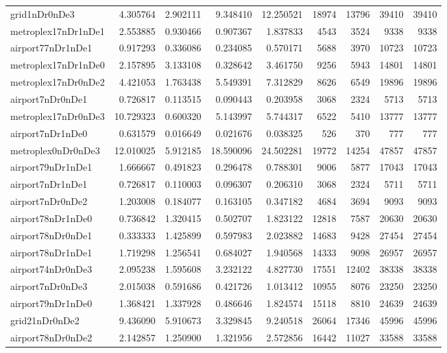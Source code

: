 \begin{longtable}{|l|r|r|r|r|r|r|r|r|}
grid1nDr0nDe3 & 4.305764 & 2.902111 & 9.348410 & 12.250521 & 18974 & 13796 & 39410 & 39410 \\
metroplex17nDr1nDe1 & 2.553885 & 0.930466 & 0.907367 & 1.837833 & 4543 & 3524 & 9338 & 9338 \\
airport77nDr1nDe1 & 0.917293 & 0.336086 & 0.234085 & 0.570171 & 5688 & 3970 & 10723 & 10723 \\
metroplex17nDr1nDe0 & 2.157895 & 3.133108 & 0.328642 & 3.461750 & 9256 & 5943 & 14801 & 14801 \\
metroplex17nDr0nDe2 & 4.421053 & 1.763438 & 5.549391 & 7.312829 & 8626 & 6549 & 19896 & 19896 \\
airport7nDr0nDe1 & 0.726817 & 0.113515 & 0.090443 & 0.203958 & 3068 & 2324 & 5713 & 5713 \\
metroplex17nDr0nDe3 & 10.729323 & 0.600320 & 5.143997 & 5.744317 & 6522 & 5410 & 13777 & 13777 \\
airport7nDr1nDe0 & 0.631579 & 0.016649 & 0.021676 & 0.038325 & 526 & 370 & 777 & 777 \\
metroplex0nDr0nDe3 & 12.010025 & 5.912185 & 18.590096 & 24.502281 & 19772 & 14254 & 47857 & 47857 \\
airport79nDr1nDe1 & 1.666667 & 0.491823 & 0.296478 & 0.788301 & 9006 & 5877 & 17043 & 17043 \\
airport7nDr1nDe1 & 0.726817 & 0.110003 & 0.096307 & 0.206310 & 3068 & 2324 & 5711 & 5711 \\
airport7nDr0nDe2 & 1.203008 & 0.184077 & 0.163105 & 0.347182 & 4684 & 3694 & 9093 & 9093 \\
airport78nDr1nDe0 & 0.736842 & 1.320415 & 0.502707 & 1.823122 & 12818 & 7587 & 20630 & 20630 \\
airport78nDr0nDe1 & 0.333333 & 1.425899 & 0.597983 & 2.023882 & 14683 & 9428 & 27454 & 27454 \\
airport78nDr1nDe1 & 1.719298 & 1.256541 & 0.684027 & 1.940568 & 14333 & 9098 & 26957 & 26957 \\
airport74nDr0nDe3 & 2.095238 & 1.595608 & 3.232122 & 4.827730 & 17551 & 12402 & 38338 & 38338 \\
airport7nDr0nDe3 & 2.015038 & 0.591686 & 0.421726 & 1.013412 & 10955 & 8076 & 23250 & 23250 \\
airport79nDr1nDe0 & 1.368421 & 1.337928 & 0.486646 & 1.824574 & 15118 & 8810 & 24639 & 24639 \\
grid21nDr0nDe2 & 9.436090 & 5.910673 & 3.329845 & 9.240518 & 26064 & 17346 & 45996 & 45996 \\
airport78nDr0nDe2 & 2.142857 & 1.250900 & 1.321956 & 2.572856 & 16442 & 11027 & 33588 & 33588 \\

\end{longtable}
